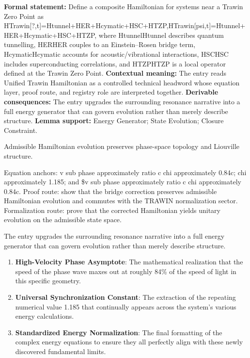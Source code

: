 \begingroup\footnotesize\setlength{\emergencystretch}{3em}\sloppy
\textbf{Formal statement:} Define a composite Hamiltonian for systems near a Trawin Zero Point as HTrawin[?,t]=Htunnel+HER+Hcymatic+HSC+HTZP,HTrawin[psi,t]=Htunnel+HER+Hcymatic+HSC+HTZP, where HtunnelHtunnel describes quantum tunnelling, HERHER couples to an Einstein--Rosen bridge term, HcymaticHcymatic accounts for acoustic/vibrational interactions, HSCHSC includes superconducting correlations, and HTZPHTZP is a local operator defined at the Trawin Zero Point. \textbf{Contextual meaning:} The entry reads Unified Trawin Hamiltonian as a controlled technical headword whose equation layer, proof route, and registry role are interpreted together. \textbf{Derivable consequences:} The entry upgrades the surrounding resonance narrative into a full energy generator that can govern evolution rather than merely describe structure. \textbf{Lemma support:} Energy Generator; State Evolution; Closure Constraint.\par
\endgroup

Admissible Hamiltonian evolution preserves phase-space topology and Liouville structure.

Equation anchors: v sub phase approximately ratio c chi approximately 0.84c; chi approximately 1.185; and \$v sub phase approximately ratio c chi approximately 0.84c. Proof route: show that the bridge correction preserves admissible Hamiltonian evolution and commutes with the TRAWIN normalization sector. Formalization route: prove that the corrected Hamiltonian yields unitary evolution on the admissible state space.

The entry upgrades the surrounding resonance narrative into a full energy generator that can govern evolution rather than merely describe structure.
\endgroup

\begin{enumerate}[leftmargin=1.6em,itemsep=6pt,topsep=4pt]
\item \textbf{High-Velocity Phase Asymptote}: The mathematical realization that the speed of the phase wave maxes out at roughly 84\% of the speed of light in this specific geometry.
\item \textbf{Universal Synchronization Constant}: The extraction of the repeating numerical value 1.185 that continually appears across the system's various energy calculations.
\item \textbf{Standardized Energy Normalization}: The final formatting of the complex energy equations to ensure they all perfectly align with these newly discovered fundamental limits.
\end{enumerate}

